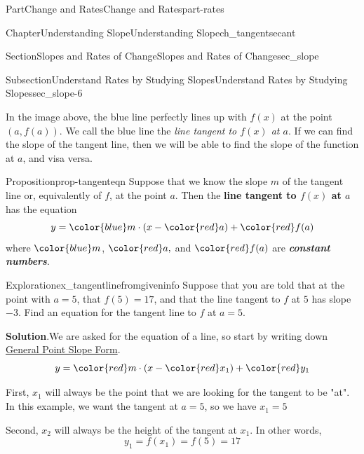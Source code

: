 \documentclass[oneside,10pt,]{tufte-book}
\newcommand{\blocktitlefont}{\relax}
\newcommand{\alert}[1]{\textbf{\textit{#1}}}
\newcommand{\terminology}[1]{\textbf{#1}}
\numberwithin{equation}{chapter}
\begin{document}
\begin{partptx}{Part}{Change and Rates}{}{Change and Rates}{}{}{part-rates}
\begin{chapterptx}{Chapter}{Understanding Slope}{}{Understanding Slope}{}{}{ch_tangentsecant}
\begin{sectionptx}{Section}{Slopes and Rates of Change}{}{Slopes and Rates of Change}{}{}{sec_slope}
\begin{subsectionptx}{Subsection}{Understand Rates by Studying Slopes}{}{Understand Rates by Studying Slopes}{}{}{sec_slope-6}
\begin{image}{0.125}{0.75}{0.125}{}
{
}%
\end{image}%
In the image above, the blue line perfectly lines up with \(f(x)\) at the point \((a,f(a))\). We call the blue line the \emph{line tangent to \(f(x)\) at \(a\)}. If we can find the slope of the tangent line, then we will be able to find the slope of the function at \(a\), and visa versa.%
\begin{proposition}{Proposition}{}{}{prop-tangenteqn}%
Suppose that we know the slope \(m\) of the tangent line or, equivalently of \(f\), at the point \(a\). Then the \terminology{line tangent to \(f(x)\) at \(a\)} has the equation%
\begin{equation*}
y = {\color{blue} m}\cdot (x - {\color{red} a}) + {\color{red} f(a)}
\end{equation*}
where \({\color{blue} m}\), \({\color{red} a},\) and \({\color{red} f(a)}\) are \alert{constant numbers}.%
\end{proposition}
\begin{exploration}{Exploration}{}{ex_tangentlinefromgiveninfo}%
Suppose that you are told that at the point with \(a=5\), that \(f(5) = 17\), and that the line tangent to \(f\) at \(5\)  has slope \(-3\).  Find an equation for the tangent line to \(f\) at \(a=5\).%
\par\smallskip%
\noindent\textbf{\blocktitlefont Solution}.\hypertarget{ex_tangentlinefromgiveninfo-2}{}\quad{}We are asked for the equation of a line, so start by writing down \hyperref[def-point_slope]{General Point Slope Form}.%
\begin{equation*}
y = {\color{red} m} \cdot (x - {\color{red} x_1}) + {\color{red} y_1}
\end{equation*}
%
\par
First, \(x_1\) will always be the point that we are looking for the tangent to be "at".  In this example, we want the tangent at \(a=5\), so we have \(x_1=5\)%
\par
Second, \(x_2\) will always be the height of the tangent at \(x_1\).  In other words,%
\begin{equation*}
y_1 = f(x_1) = f(5) = 17
\end{equation*}

\end{exploration}
\end{subsectionptx}
\end{sectionptx}
\end{chapterptx}
\end{partptx}
\end{document}
